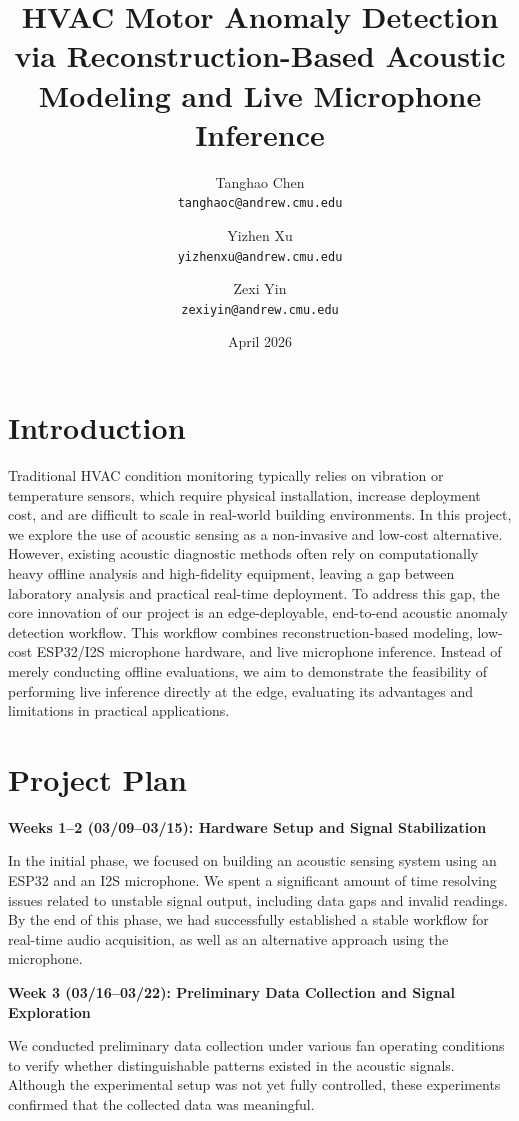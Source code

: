 \documentclass[11pt]{article}
\title{HVAC Motor Anomaly Detection via Reconstruction-Based Acoustic Modeling and Live Microphone Inference}
\author{
Tanghao Chen \\
\texttt{tanghaoc@andrew.cmu.edu}
\and
Yizhen Xu \\
\texttt{yizhenxu@andrew.cmu.edu}
\and
Zexi Yin \\
\texttt{zexiyin@andrew.cmu.edu}
}
\date{April 2026}
\begin{document}
\maketitle

\section{Introduction}

Traditional HVAC condition monitoring typically relies on vibration or temperature sensors, which require physical installation, increase deployment cost, and are difficult to scale in real-world building environments. In this project, we explore the use of acoustic sensing as a non-invasive and low-cost alternative. However, existing acoustic diagnostic methods often rely on computationally heavy offline analysis and high-fidelity equipment, leaving a gap between laboratory analysis and practical real-time deployment. To address this gap, the core innovation of our project is an edge-deployable, end-to-end acoustic anomaly detection workflow. This workflow combines reconstruction-based modeling, low-cost ESP32/I2S microphone hardware, and live microphone inference. Instead of merely conducting offline evaluations, we aim to demonstrate the feasibility of performing live inference directly at the edge, evaluating its advantages and limitations in practical applications.

\section{Project Plan}

\noindent\textbf{Weeks 1--2 (03/09--03/15): Hardware Setup and Signal Stabilization}

In the initial phase, we focused on building an acoustic sensing system using an ESP32 and an I2S microphone. We spent a significant amount of time resolving issues related to unstable signal output, including data gaps and invalid readings. By the end of this phase, we had successfully established a stable workflow for real-time audio acquisition, as well as an alternative approach using the microphone.

\noindent\textbf{Week 3 (03/16--03/22): Preliminary Data Collection and Signal Exploration}

We conducted preliminary data collection under various fan operating conditions to verify whether distinguishable patterns existed in the acoustic signals. Although the experimental setup was not yet fully controlled, these experiments confirmed that the collected data was meaningful.
\end{document}
